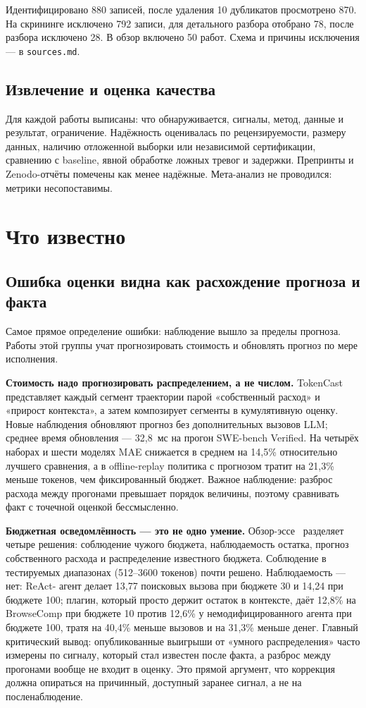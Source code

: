 \documentclass[11pt,a4paper]{article}
\begin{document}
Идентифицировано 880 записей, после удаления 10 дубликатов просмотрено 870.
На скрининге исключено 792 записи, для детального разбора отобрано 78,
после разбора исключено 28. В обзор включено 50 работ. Схема и причины
исключения — в \texttt{sources.md}.

\subsection{Извлечение и оценка качества}

Для каждой работы выписаны: что обнаруживается, сигналы, метод, данные и
результат, ограничение. Надёжность оценивалась по рецензируемости, размеру
данных, наличию отложенной выборки или независимой сертификации, сравнению
с baseline, явной обработке ложных тревог и задержки. Препринты и
Zenodo-отчёты помечены как менее надёжные. Мета-анализ не проводился:
метрики несопоставимы.

\section{Что известно}

\subsection{Ошибка оценки видна как расхождение прогноза и факта}

Самое прямое определение ошибки: наблюдение вышло за пределы прогноза.
Работы этой группы учат прогнозировать стоимость и обновлять прогноз по
мере исполнения.

\textbf{Стоимость надо прогнозировать распределением, а не числом.}
TokenCast~\cite{ouyang2026tokencast} представляет каждый сегмент
траектории парой «собственный расход» и «прирост контекста», а затем
композирует сегменты в кумулятивную оценку. Новые наблюдения обновляют
прогноз без дополнительных вызовов LLM; среднее время обновления —
32{,}8~мс на прогон SWE-bench Verified. На четырёх наборах и шести моделях
MAE снижается в среднем на 14{,}5\% относительно лучшего сравнения, а в
offline-replay политика с прогнозом тратит на 21{,}3\% меньше токенов, чем
фиксированный бюджет. Важное наблюдение: разброс расхода между прогонами
превышает порядок величины, поэтому сравнивать факт с точечной оценкой
бессмысленно.

\textbf{Бюджетная осведомлённость — это не одно умение.}
Обзор-эссе~\cite{mahendrakar2026three} разделяет четыре решения:
соблюдение чужого бюджета, наблюдаемость остатка, прогноз собственного
расхода и распределение известного бюджета. Соблюдение в тестируемых
диапазонах (512--3600 токенов) почти решено. Наблюдаемость — нет: ReAct-
агент делает 13{,}77 поисковых вызова при бюджете 30 и 14{,}24 при бюджете
100; плагин, который просто держит остаток в контексте, даёт 12{,}8\% на
BrowseComp при бюджете 10 против 12{,}6\% у немодифицированного агента при
бюджете 100, тратя на 40{,}4\% меньше вызовов и на 31{,}3\% меньше денег.
Главный критический вывод: опубликованные выигрыши от «умного
распределения» часто измерены по сигналу, который стал известен после
факта, а разброс между прогонами вообще не входит в оценку. Это прямой
аргумент, что коррекция должна опираться на причинный, доступный заранее
сигнал, а не на посленаблюдение.
\end{document}
